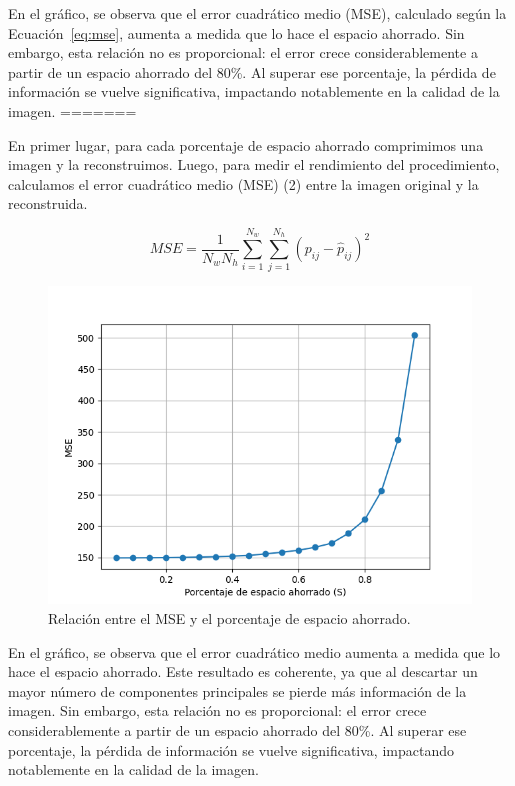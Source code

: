 \documentclass[a4paper,12pt]{article}
\begin{document}
En el gráfico, se observa que el error cuadrático medio (MSE), calculado según la Ecuación~\ref{eq:mse}, aumenta a medida que lo hace el espacio ahorrado.
Sin embargo, esta relación no es proporcional: el error crece considerablemente a partir de un espacio ahorrado del 80\%. Al superar ese porcentaje, la pérdida de información se vuelve significativa, impactando notablemente en la calidad de la imagen. 
=======
\vspace{1em}

En primer lugar, para cada porcentaje de espacio ahorrado comprimimos una imagen y la reconstruimos. Luego, para 
medir el rendimiento del procedimiento, calculamos el error cuadrático medio (MSE) (2) entre la imagen original y 
la reconstruida. 

\vspace{1em}

\begin{equation}
MSE = \frac{1}{N_w N_h} \sum_{i=1}^{N_w} \sum_{j=1}^{N_h} (p_{ij} - \hat{p}_{ij})^2
\end{equation}

\begin{figure}[H]
    \centering
    \includegraphics[width=1\textwidth]{Ejercicio 4a.png}
    \caption{Relación entre el MSE y el porcentaje de espacio ahorrado.}
    \label{fig:ej4}
\end{figure}

En el gráfico, se observa que el error cuadrático medio aumenta a medida que lo hace el espacio ahorrado.
Este resultado es coherente, ya que al descartar un mayor número de componentes principales se pierde más 
información de la imagen.
Sin embargo, esta relación no es proporcional: el error crece considerablemente a partir de un espacio 
ahorrado del 80\%. Al superar ese porcentaje, la pérdida de información se vuelve significativa, 
impactando notablemente en la calidad de la imagen. 
\end{document}
